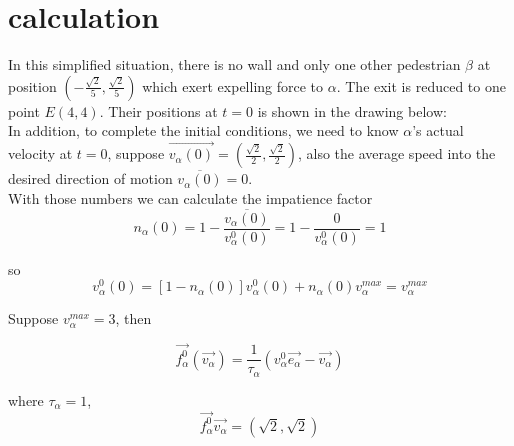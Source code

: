 \section{calculation}
In this simplified situation, there is no wall and only one other pedestrian $\beta$ at position $(-\frac{\sqrt{2}}{5}, \frac{\sqrt{2}}{5})$ which exert expelling force to $\alpha$.  The exit is reduced to one point $E(4,4)$.  Their positions at $t=0$ is shown in the drawing below:\\

In addition, to complete the initial conditions, we need to know $\alpha$'s actual velocity at $t=0$, suppose $\overrightarrow{v_{\alpha}(0)}=(\frac{\sqrt{2}}{2}, \frac{\sqrt{2}}{2})$, also the average speed into the desired direction of motion $\overline{v_{\alpha}(0)}=0$.\\

With those numbers we can calculate the impatience factor 
 \begin{equation}
 n_{\alpha}(0)=1-\frac{\overline{v_{\alpha}(0)}}{v^{0}_{\alpha}(0)}=1-\dfrac{0}{v^{0}_{\alpha}(0)}=1
 \end{equation}

so 
 \begin{equation}
 v^{0}_{\alpha}(0)=[1-n_{\alpha}(0)]v^{0}_{\alpha}(0) + n_{\alpha}(0)v_{\alpha}^{max} = v_{\alpha}^{max}
 \end{equation}
 
Suppose $v_{\alpha}^{max}=3$, then 

 \begin{equation}
 	\vec{f^{0}_{\alpha}} \left( \vec{v_{\alpha}} \right) 
= 	\frac{1}{\tau_{\alpha}} \left( v^{0}_{\alpha} 
	\vec{e_{\alpha}} - \vec{v_{\alpha}} \right)
 \end{equation}
 
where $\tau_{\alpha}=1$,
 \begin{equation}
 \overrightarrow{f^{0}_{\alpha}}\overrightarrow{v_{\alpha}} = (\sqrt{2}, \sqrt{2})
 \end{equation}

